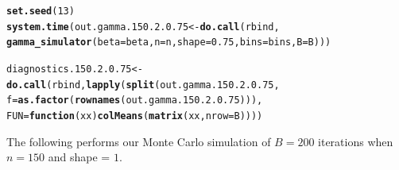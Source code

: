 \documentclass[11pt]{article}\usepackage[]{graphicx}\usepackage[]{color}
\makeatletter
\newcommand{\hlnum}[1]{\textcolor[rgb]{0.686,0.059,0.569}{#1}}%
\newcommand{\hlstd}[1]{\textcolor[rgb]{0.345,0.345,0.345}{#1}}%
\newcommand{\hlkwa}[1]{\textcolor[rgb]{0.161,0.373,0.58}{\textbf{#1}}}%
\newcommand{\hlkwb}[1]{\textcolor[rgb]{0.69,0.353,0.396}{#1}}%
\newcommand{\hlkwc}[1]{\textcolor[rgb]{0.333,0.667,0.333}{#1}}%
\newcommand{\hlkwd}[1]{\textcolor[rgb]{0.737,0.353,0.396}{\textbf{#1}}}%
\newenvironment{kframe}{%
 \def\at@end@of@kframe{}%
 \ifinner\ifhmode%
  \def\at@end@of@kframe{\end{minipage}}%
  \begin{minipage}{\columnwidth}%
 \fi\fi%
 \def\FrameCommand##1{\hskip\@totalleftmargin \hskip-\fboxsep
 \colorbox{shadecolor}{##1}\hskip-\fboxsep
     \hskip-\linewidth \hskip-\@totalleftmargin \hskip\columnwidth}%
 \MakeFramed {\advance\hsize-\width
   \@totalleftmargin\z@ \linewidth\hsize
   \@setminipage}}%
 {\par\unskip\endMakeFramed%
 \at@end@of@kframe}
\newenvironment{knitrout}{}{} %
\makeatother
\begin{document}
\begin{knitrout}
\color{fgcolor}\begin{kframe}
\begin{alltt}
\hlkwd{set.seed}\hlstd{(}\hlnum{13}\hlstd{)}
\hlkwd{system.time}\hlstd{(out.gamma.150.2.0.75} \hlkwb{<-} \hlkwd{do.call}\hlstd{(rbind,}
  \hlkwd{gamma_simulator}\hlstd{(}\hlkwc{beta} \hlstd{= beta,} \hlkwc{n} \hlstd{= n,} \hlkwc{shape} \hlstd{=} \hlnum{0.75}\hlstd{,} \hlkwc{bins} \hlstd{= bins,} \hlkwc{B} \hlstd{= B)))}
\end{alltt}


{\ttfamily\noindent\color{warningcolor}{\#\# Warning in log(ifelse(y == 0, 1, y/mu)): NaNs produced}}

{\ttfamily\noindent\bfseries\color{errorcolor}{\#\# Error: no valid set of coefficients has been found: please supply starting values}}

{\ttfamily\noindent\itshape\color{messagecolor}{\#\# Timing stopped at: 0.239 0 0.24}}\begin{alltt}
\hlstd{diagnostics.150.2.0.75} \hlkwb{<-} \hlkwd{do.call}\hlstd{(rbind,} \hlkwd{lapply}\hlstd{(}\hlkwd{split}\hlstd{(out.gamma.150.2.0.75,}
  \hlkwc{f} \hlstd{=} \hlkwd{as.factor}\hlstd{(}\hlkwd{rownames}\hlstd{(out.gamma.150.2.0.75))),}
  \hlkwc{FUN} \hlstd{=} \hlkwa{function}\hlstd{(}\hlkwc{xx}\hlstd{)} \hlkwd{colMeans}\hlstd{(}\hlkwd{matrix}\hlstd{(xx,} \hlkwc{nrow} \hlstd{= B))))}
\end{alltt}


{\ttfamily\noindent\bfseries\color{errorcolor}{\#\# Error in split(out.gamma.150.2.0.75, f = as.factor(rownames(out.gamma.150.2.0.75))): object 'out.gamma.150.2.0.75' not found}}\end{kframe}
\end{knitrout}




The following performs our Monte Carlo simulation of $B = 200$ iterations 
when $n = 150$ and shape = $1$.
\end{document}
